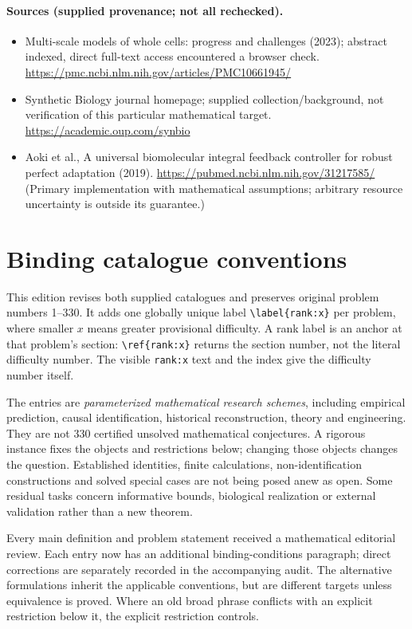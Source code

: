 \documentclass[11pt]{article}
\begin{document}
\paragraph{Sources (supplied provenance; not all rechecked).} \begin{itemize}
\item Multi-scale models of whole cells: progress and challenges (2023); abstract indexed, direct full-text access encountered a browser check. \url{https://pmc.ncbi.nlm.nih.gov/articles/PMC10661945/}
\item Synthetic Biology journal homepage; supplied collection/background, not verification of this particular mathematical target. \url{https://academic.oup.com/synbio}
\item Aoki et al., A universal biomolecular integral feedback controller for robust perfect adaptation (2019). \url{https://pubmed.ncbi.nlm.nih.gov/31217585/} (Primary implementation with mathematical assumptions; arbitrary resource uncertainty is outside its guarantee.)
\end{itemize}


\section*{Binding catalogue conventions}
This edition revises both supplied catalogues and preserves original problem numbers 1--330. It adds one globally unique label \verb|\label{rank:x}| per problem, where smaller $x$ means greater provisional difficulty. A rank label is an anchor at that problem's section: \verb|\ref{rank:x}| returns the section number, not the literal difficulty number. The visible \texttt{rank:x} text and the index give the difficulty number itself.

The entries are \emph{parameterized mathematical research schemes}, including empirical prediction, causal identification, historical reconstruction, theory and engineering. They are not 330 certified unsolved mathematical conjectures. A rigorous instance fixes the objects and restrictions below; changing those objects changes the question. Established identities, finite calculations, non-identification constructions and solved special cases are not being posed anew as open. Some residual tasks concern informative bounds, biological realization or external validation rather than a new theorem.

Every main definition and problem statement received a mathematical editorial review. Each entry now has an additional binding-conditions paragraph; direct corrections are separately recorded in the accompanying audit. The alternative formulations inherit the applicable conventions, but are different targets unless equivalence is proved. Where an old broad phrase conflicts with an explicit restriction below it, the explicit restriction controls.
\end{document}
